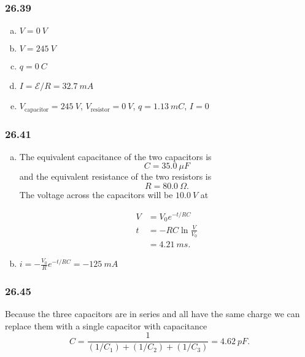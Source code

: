 \documentclass{article}
\begin{document}
\subsubsection{26.39}

\begin{enumerate}[(a)]
  \item $V = \qty{0}{V}$

  \item $V = \qty{245}{V}$

  \item $q = \qty{0}{C}$

  \item $I = \mathcal{E} / R = \qty{32.7}{mA}$

  \item $V_\textrm{capacitor} = \qty{245}{V}$, $V_\textrm{resistor} = \qty{0}{V}$, $q = \qty{1.13}{mC}$, $I = 0$
\end{enumerate}

\subsubsection{26.41}

\begin{enumerate}[(a)]
  \item The equivalent capacitance of the two capacitors is \[C = \qty{35.0}{\mu F}\] and the equivalent resistance of the two resistors is \[R = \qty{80.0}{\Omega}.\] The voltage across the capacitors will be $\qty{10.0}{V}$ at

        \begin{align*}
          V & = V_0 e^{-t / R C}       \\
          t & = -R C \ln \frac{V}{V_0} \\
            & = \qty{4.21}{ms}.
        \end{align*}

  \item $i = -\frac{V_0}{R} e^{-t / R C} = \qty{-125}{mA}$
\end{enumerate}

\subsubsection{26.45}

Because the three capacitors are in series and all have the same charge we can replace them with a single capacitor with capacitance \[C = \frac{1}{(1 / C_1) + (1 / C_2) + (1 / C_3)} = \qty{4.62}{pF}.\]
\end{document}
